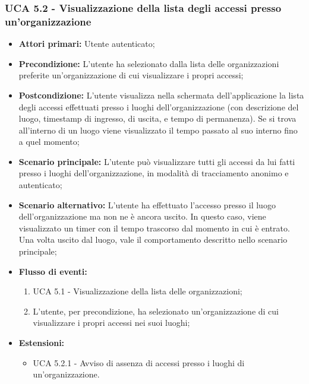 \subsubsection{UCA 5.2 - Visualizzazione della lista degli accessi presso un'organizzazione}
\begin{itemize}
    \item \textbf{Attori primari:} Utente autenticato;
    \item \textbf{Precondizione:} L'utente ha selezionato dalla lista delle organizzazioni preferite un'organizzazione di cui visualizzare i propri accessi;
    \item \textbf{Postcondizione:} L'utente visualizza nella schermata dell'applicazione la lista degli accessi effettuati presso i luoghi dell'organizzazione (con descrizione del luogo, timestamp di ingresso, di uscita, e tempo di permanenza).
    Se si trova all'interno di un luogo viene visualizzato il tempo passato al suo interno fino a quel momento;
    \item \textbf{Scenario principale:} L'utente può visualizzare tutti gli accessi da lui fatti presso i luoghi dell'organizzazione, in modalità di tracciamento anonimo e autenticato;
    \item \textbf{Scenario alternativo:} L'utente ha effettuato l'accesso presso il luogo dell'organizzazione ma non ne è ancora uscito. In questo caso, viene visualizzato un timer con il tempo trascorso dal momento in cui è entrato.
    Una volta uscito dal luogo, vale il comportamento descritto nello scenario principale;
    \item \textbf{Flusso di eventi:}
    \begin{enumerate}
        \item UCA 5.1 - Visualizzazione della lista delle organizzazioni;
        \item L'utente, per precondizione, ha selezionato un'organizzazione di cui visualizzare i propri accessi nei suoi luoghi; %
    \end{enumerate}
    \item \textbf{Estensioni:}
    \begin{itemize}
        \item UCA 5.2.1 - Avviso di assenza di accessi presso i luoghi di un'organizzazione.
    \end{itemize}
\end{itemize}

